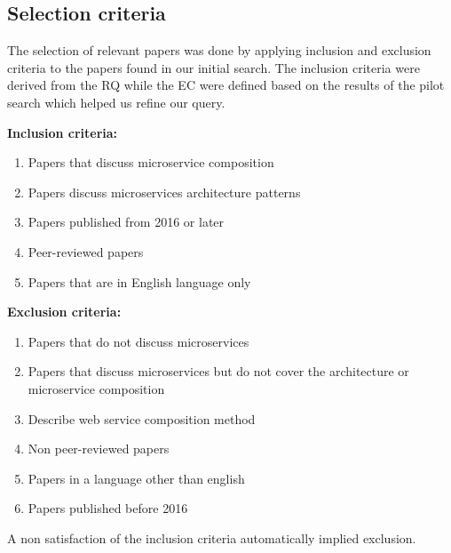 \documentclass{article}
\begin{document}
\begin{multicols}{2}
\subsection{Selection criteria}

The selection of relevant papers was done by applying inclusion and exclusion criteria to the papers found in our initial search. The inclusion criteria were derived from the RQ while the EC were defined based on the results of the pilot search which helped us refine our query.

\textbf{Inclusion criteria:}

\begin{enumerate}
\item Papers that discuss microservice composition
\item Papers discuss microservices architecture patterns
\item Papers published from 2016 or later
\item Peer-reviewed papers
\item Papers that are in English language only
\end{enumerate}

\textbf{Exclusion criteria:}

\begin{enumerate}
\item Papers that do not discuss microservices
\item Papers that discuss microservices but do not cover the architecture or microservice composition
\item Describe web service composition method
\item Non peer-reviewed papers
\item Papers in a language other than english
\item Papers published before 2016
\end{enumerate}

A non satisfaction of the inclusion criteria automatically implied exclusion. 


\end{multicols}
\end{document}
